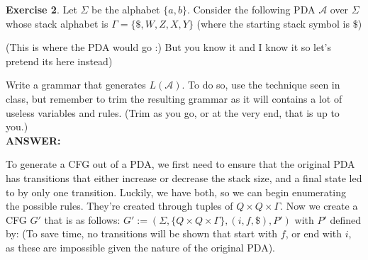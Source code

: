 \documentclass{article}
\begin{document}
\begin{center}
\end{center}


\textbf{Exercise 2}. Let $\Sigma$ be the alphabet $\{a, b\}$. Consider the following PDA $\mathcal{A}$
over $\Sigma$ whose stack alphabet is $\Gamma = \{\$, W, Z, X, Y \}$ (where the starting stack
symbol is $\$$)

(This is where the PDA would go :) But you know it and I know it so let's pretend its here instead)

Write a grammar that generates $L(\mathcal{A})$. To do so, use the technique seen in
class, but remember to trim the resulting grammar as it will contains a lot of
useless variables and rules. (Trim as you go, or at the very end, that is up to
you.)\\

\textbf{ANSWER:}

To generate a CFG out of a PDA, we first need to ensure that the original PDA has transitions that either increase or decrease the stack size, and a final state led to by only one transition. Luckily, we have both, so we can begin enumerating the possible rules. They're created through tuples of $Q \times Q \times \Gamma$. Now we create a CFG $G'$ that is as follows: $G' := (\Sigma, \{Q \times Q \times \Gamma\}, (i, f, \$), P')$ with $P'$ defined by: (To save time, no transitions will be shown that start with $f$, or end with $i$, as these are impossible given the nature of the original PDA).
\end{document}
